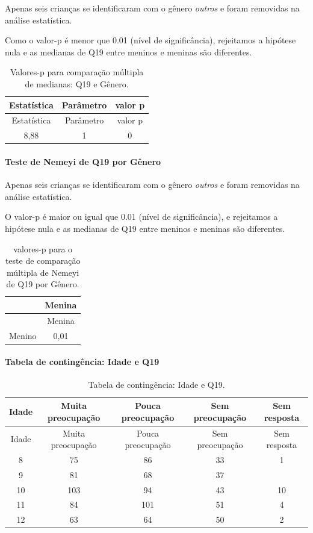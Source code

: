 \documentclass[]{article}
\let\oldparagraph\paragraph
\renewcommand{\paragraph}[1]{\oldparagraph{#1}\mbox{}}
\begin{document}
Apenas seis crianças se identificaram com o gênero \emph{outros} e foram removidas na análise estatística.

Como o valor-p é menor que 0.01 (nível de significância), rejeitamos a hipótese nula e as medianas de Q19 entre meninos e meninas são diferentes.

\begin{longtable}[]{@{}ccc@{}}
\caption{\label{tab:unnamed-chunk-325}Valores-p para comparação múltipla de medianas: Q19 e Gênero.}\tabularnewline
\toprule
Estatística & Parâmetro & valor p\tabularnewline
\midrule
\endfirsthead
\toprule
Estatística & Parâmetro & valor p\tabularnewline
\midrule
\endhead
8,88 & 1 & 0\tabularnewline
\bottomrule
\end{longtable}

\hypertarget{teste-de-nemeyi-de-q19-por-guxeanero}{%
\paragraph{Teste de Nemeyi de Q19 por Gênero}\label{teste-de-nemeyi-de-q19-por-guxeanero}}

Apenas seis crianças se identificaram com o gênero \emph{outros} e foram removidas na análise estatística.

O valor-p é maior ou igual que 0.01 (nível de significância), e rejeitamos a hipótese nula e as medianas de Q19 entre meninos e meninas são diferentes.

\begin{longtable}[]{@{}lc@{}}
\caption{\label{tab:unnamed-chunk-327}valores-p para o teste de comparação múltipla de Nemeyi de Q19 por Gênero.}\tabularnewline
\toprule
& Menina\tabularnewline
\midrule
\endfirsthead
\toprule
& Menina\tabularnewline
\midrule
\endhead
Menino & 0,01\tabularnewline
\bottomrule
\end{longtable}

\cleardoublepage

\hypertarget{tabela-de-continguxeancia-idade-e-q19}{%
\paragraph{Tabela de contingência: Idade e Q19}\label{tabela-de-continguxeancia-idade-e-q19}}

\begin{longtable}[]{@{}ccccc@{}}
\caption{\label{tab:unnamed-chunk-328}Tabela de contingência: Idade e Q19.}\tabularnewline
\toprule
Idade & Muita preocupação & Pouca preocupação & Sem preocupação & Sem resposta\tabularnewline
\midrule
\endfirsthead
\toprule
Idade & Muita preocupação & Pouca preocupação & Sem preocupação & Sem resposta\tabularnewline
\midrule
\endhead
8 & 75 & 86 & 33 & 1\tabularnewline
9 & 81 & 68 & 37 &\tabularnewline
10 & 103 & 94 & 43 & 10\tabularnewline
11 & 84 & 101 & 51 & 4\tabularnewline
12 & 63 & 64 & 50 & 2\tabularnewline
\bottomrule
\end{longtable}
\end{document}
